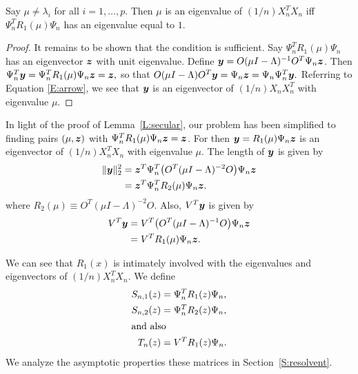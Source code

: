 \begin{lemma}\label{L:secular}
    Say $\mu \neq \lambda_i$ for all $i = 1, \ldots, p$.  Then $\mu$ is an
    eigenvalue of $(1/n) X_n^T X_n$ iff
    $\Psi_n^T R_1 (\mu) \Psi_n$ has an eigenvalue equal to $1$.
\end{lemma}
\begin{proof}
    It remains to be shown that the condition is sufficient.  Say 
    $\Psi_n^T R_1 (\mu) \Psi_n$ has an eigenvector $\boldsymbol{z}$ with unit eigenvalue. 
    Define
    $\boldsymbol{y} = O (\mu I - \Lambda)^{-1} O^T \Psi_n \boldsymbol{z}$.  Then 
    \(
        \Psi_n^T \boldsymbol{y} = \Psi_n^T R_1 (\mu) \Psi_n \boldsymbol{z} = \boldsymbol{z},
    \)
    so that
    \(
        O (\mu I - \Lambda) O^T \boldsymbol{y} 
        =
        \Psi_n \boldsymbol{z}
        =
        \Psi_n \Psi_n^T \boldsymbol{y}.
    \)
    Referring to Equation \eqref{E:arrow}, we see that
    $\boldsymbol{y}$ is an eigenvector of $(1/n) X_n X_n^T$ with
    eigenvalue $\mu$.
\end{proof}

In light of the proof of Lemma~\ref{L:secular}, our problem has been 
simplified to finding pairs $(\mu, \boldsymbol{z})$ with
$\Psi_n^T R_1 (\mu) \Psi_n \boldsymbol{z} = \boldsymbol{z}$.  For then
$\boldsymbol{y} = R_1(\mu) \Psi_n \boldsymbol{z}$ is an eigenvector of
$(1/n) X_n^T X_n$ with eigenvalue $\mu$.  The length
of $\boldsymbol{y}$ is given by
\begin{align}
    \| \boldsymbol{y} \|_2^2 
        &= \boldsymbol{z}^T \Psi_n^T \big( O^T (\mu I - \Lambda)^{-2} O \big) \Psi_n \boldsymbol{z} 
            \notag \\
        &= \boldsymbol{z}^T \Psi_n^T R_2(\mu) \Psi_n \boldsymbol{z}.
            \label{E:normY}
\end{align}
where $R_2(\mu) \equiv O^T (\mu I - \Lambda)^{-2} O$.  Also, $V^T \boldsymbol{y}$ is 
given by
\begin{align}
    V^T \boldsymbol{y} 
        &= V^T \big( O^T (\mu I - \Lambda)^{-1} O \big) \Psi_n \boldsymbol{z} \notag \\
        &= V^T R_1(\mu) \Psi_n \boldsymbol{z}.  \label{E:corrY}
\end{align}

We can see that $R_1(x)$ is intimately involved with the eigenvalues and
eigenvectors of $(1/n)X_n^T X_n$.  We define
\begin{align}
    S_{n,1} (z) &= \Psi_n^T R_1 (z) \Psi_n, \\
    S_{n,2} (z) &= \Psi_n^T R_2 (z) \Psi_n, \\
\intertext{and also}
    T_n (z) &= V^T R_1 (z) \Psi_n.
\end{align}
We analyze the asymptotic properties these matrices in
Section~\ref{S:resolvent}.

